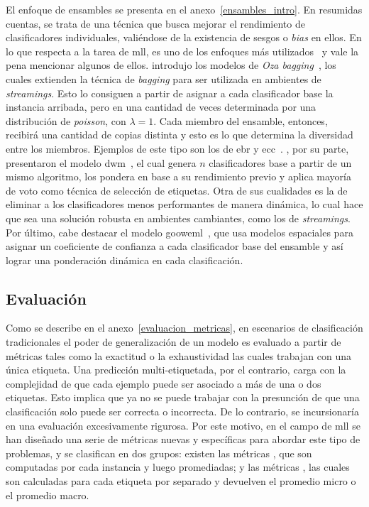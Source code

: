 El enfoque de ensambles se presenta en el anexo~\ref{ensambles_intro}. En
resumidas cuentas, se trata de una técnica que busca mejorar el rendimiento de
clasificadores individuales, valiéndose de la existencia de sesgos o
\textit{bias} en ellos. En lo que respecta a la tarea de \acrshort{mll}, es uno
de los enfoques más utilizados~\cite{herrera_multilabel_2016} y vale la pena
mencionar algunos de ellos.  \citeauthor{oza_online_2005} introdujo los modelos
de \textit{Oza bagging}~\cite{oza_online_2005}, los cuales extienden la técnica
de \textit{bagging} para ser utilizada en ambientes de \textit{streamings}. Esto
lo consiguen a partir de asignar a cada clasificador base la instancia arribada,
pero en una cantidad de veces determinada por una distribución de
\textit{poisson}, con $\lambda = 1$. Cada miembro del ensamble, entonces,
recibirá una cantidad de copias distinta y esto es lo que determina la
diversidad entre los miembros. Ejemplos de este tipo son los de \acrfull{ebr} y
\acrfull{ecc}~\cite{read_classifier_2011}.  \citeauthor{kolter_dynamic_2007},
por su parte, presentaron el modelo \acrfull{dwm}~\cite{kolter_dynamic_2007}, el
cual genera $n$ clasificadores base a partir de un mismo algoritmo, los pondera
en base a su rendimiento previo y aplica mayoría de voto como técnica de
selección de etiquetas. Otra de sus cualidades es la de eliminar a los
clasificadores menos performantes de manera dinámica, lo cual hace que sea una
solución robusta en ambientes cambiantes, como los de \textit{streamings}.  Por
último, cabe destacar el modelo \acrshort{gooweml}~\cite{buyukcakir_novel_2018},
que usa modelos espaciales para asignar un coeficiente de confianza a cada
clasificador base del ensamble y así lograr una ponderación dinámica en cada
clasificación.

\subsection{Evaluación}
\label{mll_evaluacion}

Como se describe en el anexo~\ref{evaluacion_metricas}, en escenarios de
clasificación tradicionales el poder de generalización de un modelo es evaluado
a partir de métricas tales como la exactitud o la exhaustividad las cuales
trabajan con una única etiqueta. Una predicción multi-etiquetada, por el
contrario, carga con la complejidad de que cada ejemplo puede ser asociado a más
de una o dos etiquetas. Esto implica que ya no se puede trabajar con la
presunción de que una clasificación solo puede ser correcta o incorrecta. De lo
contrario, se incursionaría en una evaluación excesivamente rigurosa. Por este
motivo, en el campo de \acrshort{mll} se han diseñado una serie de métricas
nuevas y específicas para abordar este tipo de problemas, y se clasifican en dos
grupos: existen las métricas , que son computadas
por cada instancia y luego promediadas; y las métricas , las cuales son calculadas para cada etiqueta por separado y
devuelven el promedio micro o el promedio macro.

